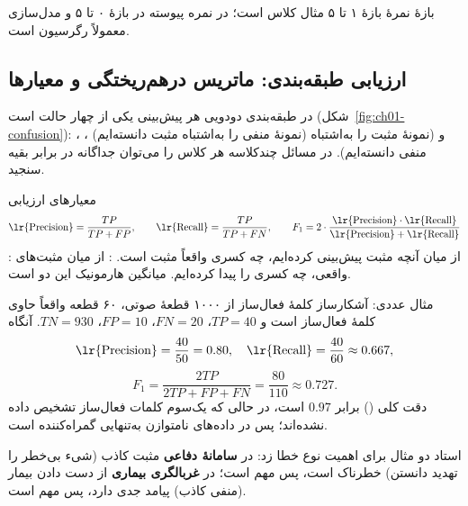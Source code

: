 \begin{correctionbox}{بازهٔ نمرهٔ }
بازهٔ ۱ تا ۵ مثال کلاس است؛ در  نمره پیوسته در بازهٔ ۰ تا ۵ و مدل‌سازی معمولاً رگرسیون است.
\end{correctionbox}

\subsection{ارزیابی طبقه‌بندی: ماتریس درهم‌ریختگی و معیارها}
در طبقه‌بندی دودویی هر پیش‌بینی یکی از چهار حالت است (شکل~\ref{fig:ch01-confusion}): ، ،  (نمونهٔ منفی را به‌اشتباه مثبت دانسته‌ایم) و  (نمونهٔ مثبت را به‌اشتباه منفی دانسته‌ایم). در مسائل چندکلاسه هر کلاس را می‌توان جداگانه در برابر بقیه سنجید.


\begin{definitionbox}{معیارهای ارزیابی}
\[
\text{\lr{Precision}}=\frac{TP}{TP+FP},\qquad
\text{\lr{Recall}}=\frac{TP}{TP+FN},\qquad
F_1=2\cdot\frac{\text{\lr{Precision}}\cdot\text{\lr{Recall}}}{\text{\lr{Precision}}+\text{\lr{Recall}}}
\]
: از میان آنچه مثبت پیش‌بینی کرده‌ایم، چه کسری واقعاً مثبت است. : از میان مثبت‌های واقعی، چه کسری را پیدا کرده‌ایم.  میانگین هارمونیک این دو است.
\end{definitionbox}

\begin{addedbox}{مثال عددی: آشکارساز کلمهٔ فعال‌ساز}
از ۱۰۰۰ قطعهٔ صوتی، ۶۰ قطعه واقعاً حاوی کلمهٔ فعال‌ساز است و $TP=40$، $FN=20$، $FP=10$، $TN=930$. آنگاه
\[
\text{\lr{Precision}}=\frac{40}{50}=0.80,\quad
\text{\lr{Recall}}=\frac{40}{60}\approx0.667,
\]
\[
F_1=\frac{2TP}{2TP+FP+FN}=\frac{80}{110}\approx0.727.
\]
دقت کلی () برابر $0.97$ است، در حالی که یک‌سوم کلمات فعال‌ساز تشخیص داده نشده‌اند؛ پس در داده‌های نامتوازن  به‌تنهایی گمراه‌کننده است.
\end{addedbox}

استاد دو مثال برای اهمیت نوع خطا زد: در \textbf{سامانهٔ دفاعی} مثبت کاذب (شیء بی‌خطر را تهدید دانستن) خطرناک است، پس  مهم است؛ در \textbf{غربالگری بیماری} از دست دادن بیمار (منفی کاذب) پیامد جدی دارد، پس  مهم است.

